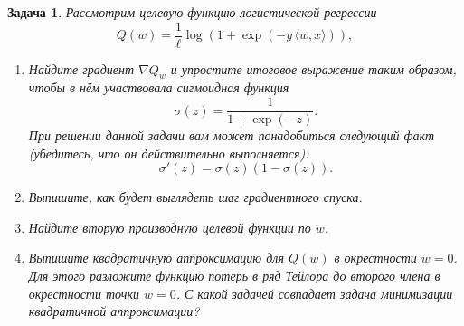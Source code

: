 \documentclass[12pt,fleqn]{article}
\newtheorem{esProblem}{Задача}
\begin{document}
\begin{esProblem}
    Рассмотрим целевую функцию логистической регрессии 
    \[
    Q(w) = \frac{1}{\ell} \log (1 + \exp(-y \, \langle w, x\rangle)),
    \]
    
    \begin{enumerate} 
    \item Найдите градиент $\nabla Q_w$ и упростите итоговое выражение таким образом, чтобы в нём участвовала сигмоидная функция 
    $$\sigma(z) = \frac{1}{1 + \exp(-z)}.$$ При решении данной задачи вам может понадобиться следующий факт (убедитесь, что он действительно выполняется):
    $$\sigma'(z) = \sigma(z) (1- \sigma(z)).$$ 
    \item Выпишите, как будет выглядеть шаг градиентного спуска.
    \item Найдите вторую производную целевой функции по $w$.
    \item Выпишите квадратичную аппроксимацию для $Q(w)$ в окрестности $w=0$. Для этого разложите функцию потерь в ряд Тейлора до второго члена в окрестности точки $w=0$. С какой задачей совпадает задача минимизации квадратичной аппроксимации?
    \end{enumerate} 
\end{esProblem}
\end{document}
